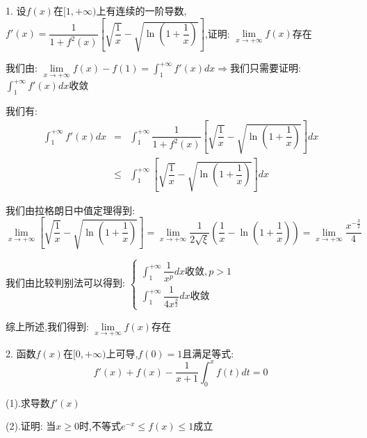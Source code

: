 1. 设$f(x)$在$[1,+\infty)$上有连续的一阶导数,$f'(x)=\dfrac{1}{1+f^{2}(x)}\left[\sqrt{\dfrac{1}{x}}-\sqrt{\ln(1+\dfrac{1}{x})} \right] $,证明:  $\lim\limits_{x\rightarrow +\infty}f(x)$存在
\begin{solution}

	我们由:  $\lim\limits_{x\rightarrow +\infty}f(x)-f(1)=\int_{1}^{+\infty}f'(x)dx\Rightarrow $我们只需要证明:  $\int_{1}^{+\infty}f'(x)dx$收敛
	
	我们有:  
	\begin{eqnarray*}
		\int_{1}^{+\infty}f'(x)dx&=&\int_{1}^{+\infty}\dfrac{1}{1+f^{2}(x)}\left[\sqrt{\dfrac{1}{x}}-\sqrt{\ln(1+\dfrac{1}{x})} \right]dx\\
		&\leq&\int_{1}^{+\infty}\left[\sqrt{\dfrac{1}{x}}-\sqrt{\ln(1+\dfrac{1}{x})} \right]dx
	\end{eqnarray*}
	
	我们由拉格朗日中值定理得到:  
	$$\lim\limits_{x\rightarrow+\infty}\left[\sqrt{\dfrac{1}{x}}-\sqrt{\ln(1+\dfrac{1}{x})} \right]=\lim\limits_{x\rightarrow+\infty}\dfrac{1}{2\sqrt{\xi}}\left(\dfrac{1}{x}-\ln(1+\dfrac{1}{x}) \right)=\lim\limits_{x\rightarrow+\infty}\dfrac{x^{-\frac{3}{2}}}{4}$$
	
	我们由比较判别法可以得到:  $\left\lbrace 
	\begin{array}{l}
		\int_{1}^{+\infty}\dfrac{1}{x^p}dx\text{收敛},p>1\\
		\int_{1}^{+\infty}\dfrac{1}{4x^{\frac{3}{2}}}dx\text{收敛}
	\end{array}
	\right. $
	
	综上所述,我们得到:  $\lim\limits_{x\rightarrow +\infty}f(x)$存在
\end{solution}

2. 函数$f(x)$在$[0,+\infty)$上可导,$f(0)=1$且满足等式:  
$$f'(x)+f(x)-\dfrac{1}{x+1}\int_{0}^{x}f(t)dt=0$$

(1).求导数$f'(x)$

(2).证明:  当$x\geq 0$时,不等式$e^{-x}\leq f(x)\leq 1$成立


